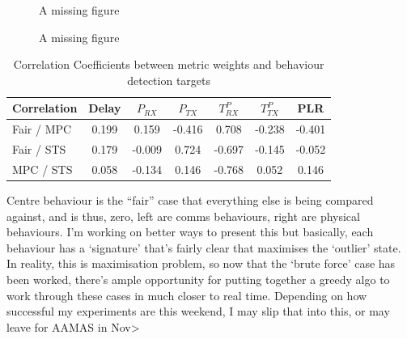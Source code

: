 \begin{figure}[h]
	\centering
	\caption{A missing figure}
	\label{fig:comms_trust_signature}
\end{figure}

\begin{figure}[h]
	\centering
	\caption{A missing figure}
	\label{fig:comms_trust_signature}
\end{figure}

\begin{table}[h]
	\caption{Correlation Coefficients between metric weights and behaviour detection targets} \label{tab:comms_correlations}
	\begin{center}
		\begin{tabular}{lcccccc}
			\toprule
			Correlation      & Delay & $P_{RX}$ & $P_{TX}$ & $T^P_{RX}$ & $T^P_{TX}$ & PLR \\
			\midrule
			Fair / MPC       & 0.199 &  0.159   & -0.416  &  0.708   & -0.238   & -0.401\\
			Fair / STS       & 0.179 &  -0.009  &  0.724  & -0.697   & -0.145   & -0.052\\
			MPC / STS        & 0.058 &  -0.134  &  0.146  & -0.768   &  0.052   &  0.146\\
			\bottomrule
		\end{tabular}
	\end{center}
\end{table}

Centre behaviour is the “fair” case that everything else is being compared against, and is thus, zero, left are comms behaviours, right are physical behaviours. I’m working on better ways to present this but basically, each behaviour has a ‘signature’ that’s fairly clear that maximises the ‘outlier’ state. In reality, this is maximisation problem, so now that the ‘brute force’ case has been worked, there’s ample opportunity for putting together a greedy algo to work through these cases in much closer to real time. Depending on how successful my experiments are this weekend, I may slip that into this, or may leave for AAMAS in Nov> 

